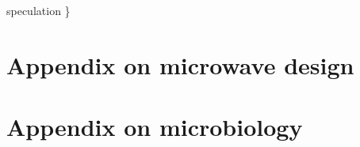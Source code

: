 \documentclass[fleqn,10pt]{article}
\begin{document}
{\color{red} speculation \} } 









%








\section{Appendix on microwave design}



\section{Appendix on microbiology}





\nocite{*}

\end{document}
